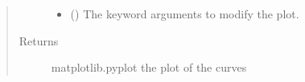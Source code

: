\documentclass[letterpaper,10pt,english]{sphinxmanual}
\begin{document}
\begin{fulllineitems}
\begin{quote}
\begin{description}
\begin{itemize}
\item {} 
 () \textendash{} The keyword arguments to modify the plot.

\end{itemize}

\item[{Returns}] \leavevmode
matplotlib.pyplot \textendash{} the plot of the curves

\end{description}\end{quote}

\end{fulllineitems}

\end{document}
